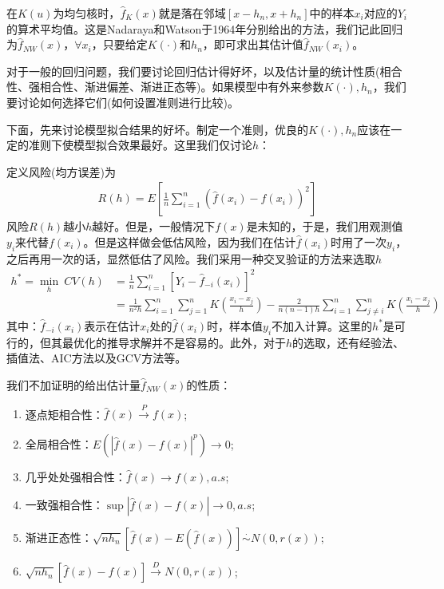             在$K(u)$为均匀核时，$\hat{f}_K(x)$就是落在邻域$[x-h_n,x+h_n]$中的样本$x_i$对应的$Y_i$的算术平均值。这是Nadaraya和Watson于1964年分别给出的方法，我们记此回归为$\hat{f}_{NW}(x)$，$\forall x_i$，只要给定$K(\cdot)$和$h_n$，即可求出其估计值$\hat{f}_{NW}(x_i)$。
            \par
            对于一般的回归问题，我们要讨论回归估计得好坏，以及估计量的统计性质(相合性、强相合性、渐进偏差、渐进正态等)。如果模型中有外来参数$K(\cdot),h_n$，我们要讨论如何选择它们(如何设置准则进行比较)。
            \par
            下面，先来讨论模型拟合结果的好坏。制定一个准则，优良的$K(\cdot),h_n$应该在一定的准则下使模型拟合效果最好。这里我们仅讨论$h$：
            \par
            定义风险(均方误差)为
            \begin{align*}
            R(h) = E\left[ \frac{1}{n} \sum_{i=1}^n(\hat{f}(x_i) - f(x_i))^2  \right]
            \end{align*}
            风险$R(h)$越小$h$越好。但是，一般情况下$f(x)$是未知的，于是，我们用观测值$y_i$来代替$f(x_i)$。但是这样做会低估风险，因为我们在估计$\hat{f}(x_i)$时用了一次$y_i$，之后再用一次的话，显然低估了风险。我们采用一种交叉验证的方法来选取$h$
            \begin{align*}
            h^* = \min_h \ CV(h) &= \frac{1}{n}\sum_{i=1}^n[Y_i - \hat{f}_{-i}(x_i)]^2\\
            &= \frac{1}{n^2h} \sum_{i=1}^n\sum_{j=1}^n K \left( \frac{x_i - x_j}{h} \right) - \frac{2}{n(n-1)h}\sum_{i=1}^n\sum_{j \neq i}^nK\left( \frac{x_i - x_j}{h} \right)
            \end{align*}
            其中：$\hat{f}_{-i}(x_i)$表示在估计$x_i$处的$\hat{f}(x_i)$时，样本值$y_i$不加入计算。这里的$h^*$是可行的，但其最优化的推导求解并不是容易的。此外，对于$h$的选取，还有经验法、插值法、AIC方法以及GCV方法等。
            \par
            我们不加证明的给出估计量$\hat{f}_{NW}(x)$的性质：
            \begin{enumerate}
            \item 逐点矩相合性：$\hat{f}(x)\xrightarrow{P}f(x)$;
            \item 全局相合性：$E(|\hat{f}(x) - f(x)|^p)\rightarrow 0$;
            \item 几乎处处强相合性：$\hat{f}(x)\rightarrow f(x),a.s$;
            \item 一致强相合性：$\sup |\hat{f}(x) - f(x)| \rightarrow 0,a.s$;
            \item 渐进正态性：$\sqrt{nh_n} [\hat{f}(x) - E(\hat{f}(x))]\overset{\cdot}{\sim} N(0,r(x))$;
            \item $\sqrt{nh_n} [\hat{f}(x) - {f}(x)]\xrightarrow{D}N(0,r(x))$;
            \end{enumerate}

